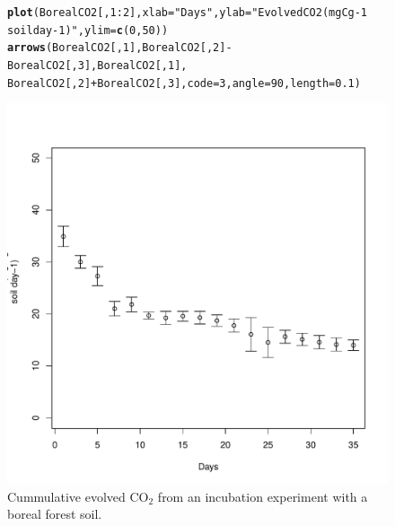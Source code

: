 \documentclass[a4paper]{article}\usepackage[]{graphicx}\usepackage[]{color}
\makeatletter
\def\maxwidth{ %
  \ifdim\Gin@nat@width>\linewidth
    \linewidth
  \else
    \Gin@nat@width
  \fi
}
\newcommand{\hlnum}[1]{\textcolor[rgb]{0.686,0.059,0.569}{#1}}%
\newcommand{\hlstr}[1]{\textcolor[rgb]{0.192,0.494,0.8}{#1}}%
\newcommand{\hlopt}[1]{\textcolor[rgb]{0,0,0}{#1}}%
\newcommand{\hlstd}[1]{\textcolor[rgb]{0.345,0.345,0.345}{#1}}%
\newcommand{\hlkwc}[1]{\textcolor[rgb]{0.333,0.667,0.333}{#1}}%
\newcommand{\hlkwd}[1]{\textcolor[rgb]{0.737,0.353,0.396}{\textbf{#1}}}%
\newenvironment{kframe}{%
 \def\at@end@of@kframe{}%
 \ifinner\ifhmode%
  \def\at@end@of@kframe{\end{minipage}}%
  \begin{minipage}{\columnwidth}%
 \fi\fi%
 \def\FrameCommand##1{\hskip\@totalleftmargin \hskip-\fboxsep
 \colorbox{shadecolor}{##1}\hskip-\fboxsep
     \hskip-\linewidth \hskip-\@totalleftmargin \hskip\columnwidth}%
 \MakeFramed {\advance\hsize-\width
   \@totalleftmargin\z@ \linewidth\hsize
   \@setminipage}}%
 {\par\unskip\endMakeFramed%
 \at@end@of@kframe}
\newenvironment{knitrout}{}{} %
\makeatother
\begin{document}
\begin{figure}
  \centering
\begin{knitrout}
\color{fgcolor}\begin{kframe}
\begin{alltt}
\hlkwd{plot}\hlstd{(BorealCO2[,}\hlnum{1}\hlopt{:}\hlnum{2}\hlstd{],} \hlkwc{xlab}\hlstd{=}\hlstr{"Days"}\hlstd{,} \hlkwc{ylab}\hlstd{=}\hlstr{"Evolved CO2 (mgC g-1 
     soil day-1)"}\hlstd{,}\hlkwc{ylim}\hlstd{=}\hlkwd{c}\hlstd{(}\hlnum{0}\hlstd{,}\hlnum{50}\hlstd{))}
\hlkwd{arrows}\hlstd{(BorealCO2[,}\hlnum{1}\hlstd{],BorealCO2[,}\hlnum{2}\hlstd{]}\hlopt{-}\hlstd{BorealCO2[,}\hlnum{3}\hlstd{],BorealCO2[,}\hlnum{1}\hlstd{],}
       \hlstd{BorealCO2[,}\hlnum{2}\hlstd{]}\hlopt{+}\hlstd{BorealCO2[,}\hlnum{3}\hlstd{],}\hlkwc{code}\hlstd{=}\hlnum{3}\hlstd{,}\hlkwc{angle}\hlstd{=}\hlnum{90}\hlstd{,}\hlkwc{length}\hlstd{=}\hlnum{0.1}\hlstd{)}
\end{alltt}
\end{kframe}
\includegraphics[width=\maxwidth]{figure/unnamed-chunk-5-1} 

\end{knitrout}
  \caption{Cummulative evolved CO$_2$ from an incubation experiment with a boreal forest soil.}
  \label{fig:eCO2}
\end{figure}
\end{document}
